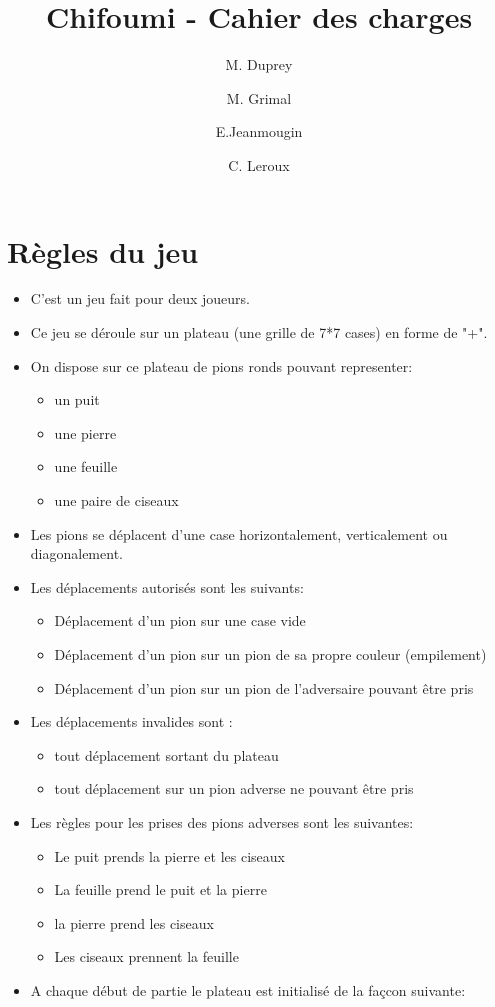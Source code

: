 \documentclass[12pt]{article}
\begin{document}
 
\title{Chifoumi - Cahier des charges}
\author{M. Duprey \and M. Grimal \and E.Jeanmougin \and C. Leroux}
 
 
 \maketitle
 
 \newpage
 \tableofcontents
\newpage

\section{Règles du jeu}

\begin{itemize}

 \item C'est un jeu fait pour deux joueurs.
 \item Ce jeu se déroule sur un plateau (une grille de 7*7 cases) en forme de "+".
 \item On dispose sur ce plateau de pions ronds pouvant representer:
 \begin{itemize}
    \item[\textbullet] un puit
    \item[\textbullet] une pierre
    \item[\textbullet] une feuille
    \item[\textbullet] une paire de ciseaux
 \end{itemize}
\item Les pions se déplacent d'une case horizontalement, verticalement ou diagonalement.
\item Les déplacements autorisés sont les suivants:
\begin{itemize}
  \item[\textbullet]Déplacement d'un pion sur une case vide
  \item[\textbullet]Déplacement d'un pion sur un pion de sa propre couleur (empilement)
  \item[\textbullet]Déplacement d'un pion sur un pion de l'adversaire pouvant être pris
\end{itemize}
\item Les déplacements invalides sont :
\begin{itemize}
 \item[\textbullet] tout déplacement sortant du plateau 
 \item[\textbullet] tout déplacement sur un pion adverse ne pouvant être pris
\end{itemize}
  \item Les règles pour les prises des pions adverses sont les suivantes:
\begin{itemize}
  \item[\textbullet]Le puit prends la pierre et les ciseaux
  \item[\textbullet]La feuille prend le puit et la pierre
  \item[\textbullet]la pierre prend les ciseaux
  \item[\textbullet]Les ciseaux prennent la feuille
\end{itemize}
\item A chaque début de partie le plateau est initialisé de la façcon suivante:


\end{itemize}
\end{document}
